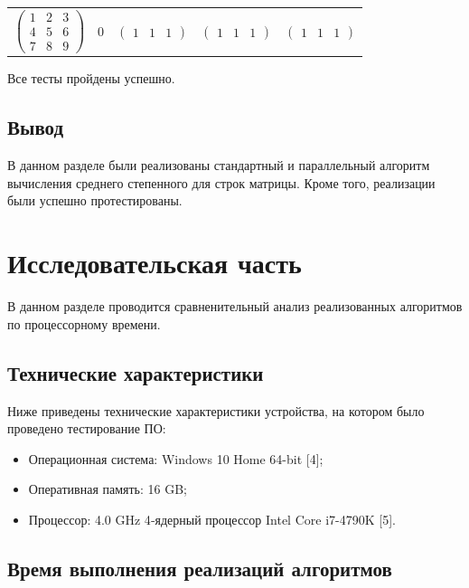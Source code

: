 \documentclass[12pt]{report}
\begin{document}
\begin{table}[H]
\begin{center}
\begin{tabular}{c c c c c}
			$\begin{pmatrix}
				1 & 2 & 3\\
				4 & 5 & 6\\
				7 & 8 & 9
			\end{pmatrix}$ &
			0 &
			$\begin{pmatrix}
				1 & 1 & 1
			\end{pmatrix}$ &
			$\begin{pmatrix}
				1 & 1 & 1
			\end{pmatrix}$ &
			$\begin{pmatrix}
				1 & 1 & 1
			\end{pmatrix}$ \\
		\end{tabular}
	\end{center}
\end{table}
Все тесты пройдены успешно.
\section{Вывод}

В данном разделе были реализованы стандартный и параллельный алгоритм вычисления среднего степенного для строк матрицы. Кроме того, реализации были успешно протестированы.

\newpage

\chapter{Исследовательская часть}

В данном разделе проводится сравненительный анализ реализованных алгоритмов по процессорному времени.

\section{Технические характеристики}

Ниже приведены технические характеристики устройства, на котором было проведено тестирование ПО:

\begin{itemize}
	\item Операционная система: Windows 10 Home 64-bit [4];
	\item Оперативная память: 16 GB;
	\item Процессор: 4.0 GHz 4‑ядерный процессор Intel Core i7-4790K [5].

\end{itemize}

\section{Время выполнения реализаций алгоритмов}
\end{document}
